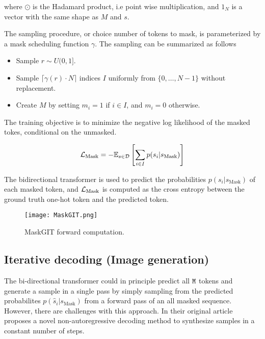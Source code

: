 \documentclass[../../thesis.tex]{subfiles}
\begin{document}
where $\odot$ is the Hadamard product, i.e point wise multiplication, and $1_N$ is a vector with the same shape as $M$ and $s$.\newline

The sampling procedure, or choice number of tokens to mask, is parameterized by a mask scheduling function $\gamma$. The sampling can be summarized as follows

\begin{itemize}
    \item Sample $r \sim U(0,1]$.
    \item Sample $\lceil \gamma(r)\cdot N \rceil$ indices $I$ uniformly from $\{0,\dots,N-1\}$ without replacement. 
    \item Create $M$ by setting $m_i = 1$ if $i\in I$, and $m_i = 0$ otherwise.
\end{itemize}

The training objective is to minimize the negative log likelihood of the masked tokes, conditional on the unmasked. 

\begin{equation}
    \mathcal{L}_\text{Mask} = -\mathbb{E}_{s\in \mathcal{D}}\left[\sum_{i \in I} p(s_i|s_\text{Mask} ) \right]
\end{equation}

The bidirectional transformer is used to predict the probabilities $p(s_i|s_\text{Mask})$ of each masked token, and $\mathcal{L}_\text{Mask}$ is computed as the cross entropy between the ground truth one-hot token and the predicted token.

\begin{figure}[h]
    \texttt{[image: MaskGIT.png]}
    \centering 
    \label{fig:MaskGIT}
    \caption{MaskGIT forward computation.}
\end{figure}

\subsection{Iterative decoding (Image generation)}

The bi-directional transformer could in principle predict all $\texttt{M}$ tokens and generate a sample in a single pass by simply sampling from the predicted probabilites $p(\widehat{s}_i|s_\text{Mask})$ from a forward pass of an all masked sequence. However, there are challenges with this approach. In their original article \cite{chang2022maskgit} proposes a novel non-autoregressive decoding method to synthesize samples in a constant number of steps.\newline
\end{document}
